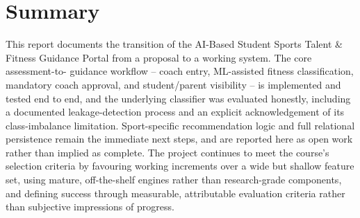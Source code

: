 \documentclass[11pt,a4paper]{article}
\begin{document}
\section{Summary}
This report documents the transition of the AI-Based
Student Sports Talent \& Fitness Guidance Portal from a
proposal to a working system. The core assessment-to-
guidance workflow -- coach entry, ML-assisted fitness
classification, mandatory coach approval, and
student/parent visibility -- is implemented and tested end
to end, and the underlying classifier was evaluated
honestly, including a documented leakage-detection process
and an explicit acknowledgement of its class-imbalance
limitation. Sport-specific recommendation logic and full
relational persistence remain the immediate next steps,
and are reported here as open work rather than implied as
complete. The project continues to meet the course's
selection criteria by favouring working increments over a
wide but shallow feature set, using mature, off-the-shelf
engines rather than research-grade components, and
defining success through measurable, attributable
evaluation criteria rather than subjective impressions of
progress.
\end{document}
